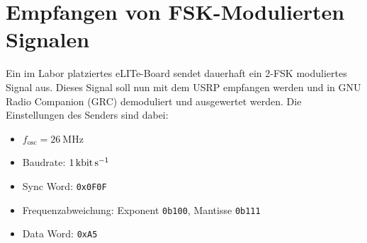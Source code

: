 \newpage
\section{Empfangen von FSK-Modulierten Signalen}\label{sec:task1}


Ein im Labor platziertes eLITe-Board sendet dauerhaft ein 2-FSK moduliertes Signal aus. Dieses Signal soll nun mit dem USRP empfangen werden und in GNU Radio Companion (GRC) demoduliert und ausgewertet werden. Die Einstellungen des Senders sind dabei:

\begin{itemize}[noitemsep]
    \item $f_\text{osc} = \SI{26}{\mega\hertz}$
    \item Baudrate: $\SI{1}{\kilo\bit\per\second}$
    \item Sync Word: \texttt{0x0F0F}
    \item Frequenzabweichung: Exponent \texttt{0b100}, Mantisse \texttt{0b111} 
    \item Data Word: \texttt{0xA5}
\end{itemize}

